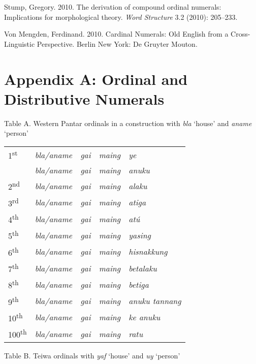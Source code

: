 Stump,  Gregory. 2010.\textit{ }The derivation of compound ordinal numerals: Implications for morphological theory. \textit{Word Structure} 3.2 (2010): 205--233.

Von Mengden, Ferdinand. 2010. Cardinal Numerals: Old English from a Cross-Linguistic Perspective. Berlin New York: De Gruyter Mouton.

\clearpage\section[Appendix A: Ordinal and Distributive Numerals ]{Appendix A: Ordinal and Distributive Numerals }
\hypertarget{RefHeading105262871885726}{} Table A. Western Pantar ordinals in a construction with \textit{bla }{\textquoteleft}house{\textquoteright} and \textit{aname} {\textquoteleft}person{\textquoteright}

\begin{flushleft}
\tablehead{}
\begin{supertabular}{m{0.48795983in}m{1.0531598in}m{0.42125985in}m{0.9205598in}m{2.4094598in}}
1\textsuperscript{st} &
\textit{bla/aname} &
\textit{gai} &
\textit{maing} &
\textit{ye}\\
 &
\textit{bla/aname} &
\textit{gai} &
\textit{maing} &
\textit{anuku}\\
2\textsuperscript{nd} &
\textit{bla/aname} &
\textit{gai} &
\textit{maing} &
\textit{alaku}\\
3\textsuperscript{rd} &
\textit{bla/aname} &
\textit{gai} &
\textit{maing} &
\textit{atiga}\\
4\textsuperscript{th} &
\textit{bla/aname} &
\textit{gai} &
\textit{maing} &
\textit{at\'u}\\
5\textsuperscript{th} &
\textit{bla/aname} &
\textit{gai} &
\textit{maing} &
\textit{yasing}\\
6\textsuperscript{th} &
\textit{bla/aname} &
\textit{gai} &
\textit{maing} &
\textit{hisnakkung}\\
7\textsuperscript{th} &
\textit{bla/aname} &
\textit{gai} &
\textit{maing} &
\textit{betalaku}\\
8\textsuperscript{th} &
\textit{bla/aname} &
\textit{gai} &
\textit{maing} &
\textit{betiga}\\
9\textsuperscript{th} &
\textit{bla/aname} &
\textit{gai} &
\textit{maing} &
\textit{anuku tannang}\\
10\textsuperscript{th} &
\textit{bla/aname} &
\textit{gai} &
\textit{maing} &
\textit{ke anuku}\\
100\textsuperscript{th} &
\textit{bla/aname} &
\textit{gai} &
\textit{maing} &
\textit{ratu}\\
\end{supertabular}
\end{flushleft}
Table B. Teiwa ordinals with \textit{yaf }{\textquoteleft}house{\textquoteright} and \textit{uy }{\textquoteleft}person{\textquoteright} 

